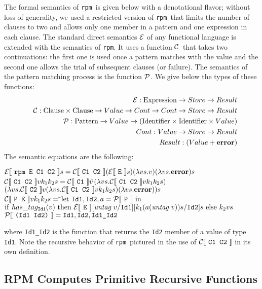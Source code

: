 \documentclass[a4paper,11pt]{article}
\newcommand{\rpm}{\texttt{rpm}}
\newcommand{\E}{\mbox{${\cal E}$}}
\newcommand{\C}{\mbox{${\cal C}$}}
\renewcommand{\P}{\mbox{${\cal P}$}}
\newcommand{\dbl}[1]{\mbox{$\lbrack\!\lbrack$~\texttt{#1}~$\rbrack\!\rbrack$}}
\newcommand{\Exp}{{\rm Expression}}
\newcommand{\Ide}{{\rm Identifier}}
\newcommand{\Cl}{{\rm Clause}}
\newcommand{\Pat}{{\rm Pattern}}
\begin{document}
The formal semantics of \rpm\ is given below with a denotational
flavor; without loss of generality, we used a restricted version of
\rpm\ that limits the number of clauses to two and allows only one
member in a pattern and one expression in each clause.
The standard direct semantics $\E$ of any functional
language is extended with the semantics of \rpm. It uses a
function \C\ that takes two continuations: the first one is used once
a pattern matches with the value and the second one allows the trial
of subsequent clauses (or failure). The semantics of the pattern
matching process is the function $\P$. We give below the types of
these functions:
\begin{eqnarray*}
&&\E : \Exp \rightarrow Store \rightarrow Result \\
&&\C : \Cl \times \Cl \rightarrow Value \rightarrow Cont \rightarrow Cont
        \rightarrow Store \rightarrow Result \\
&&\P : \Pat \rightarrow Value \rightarrow 
        (\Ide \times \Ide \times Value) \\
&&Cont : Value \rightarrow Store \rightarrow Result \\
&& Result :  (Value + {\bf error})
\end{eqnarray*}
The semantic equations are the following:
\begin{tabbing}
$\E\dbl{rpm E C1 C2}s = 
        \C\dbl{C1 C2}(\E\dbl{E}s)(\lambda vs.v)(\lambda vs.{\bf error})s $\\
$\C\dbl{C1 C2}vk_1k_2s = 
        \C\dbl{C1}v$\=$(\lambda vs.\C\dbl{C1 C2}vk_1k_2s)$ \\
        \>$(\lambda vs.\C\dbl{C2}v(\lambda vs.\C\dbl{C1 C2}vk_1k_2s)
        (\lambda vs.{\bf error}))s$ \\
$\C\dbl{P E}vk_1k_2s =$ \=${\rm let}~\texttt{Id1},\texttt{Id2},a = 
        \P\dbl{P}~{\rm in}$\\
        \>${\rm if}~has\_tag_\texttt{Id1}(v)~{\rm then}~
                \E\dbl{E}[\emph{untag}~v/\texttt{Id1}][k_1 (a(\emph{untag}~v)) s/\texttt{Id2}]s~
        {\rm else}~k_2 v s$ \\
$\P\dbl{(Id1 Id2)} = \texttt{Id1}, \texttt{Id2}, \texttt{Id1\_Id2}$
\end{tabbing}
where \texttt{Id1\_Id2} is the function that returns the \texttt{Id2}
member of a value of type \texttt{Id1}.  Note the recursive behavior of
\rpm\ pictured in the use of $\C\dbl{C1 C2}$ in its own definition.

\subsection{RPM Computes Primitive Recursive Functions}
\end{document}
